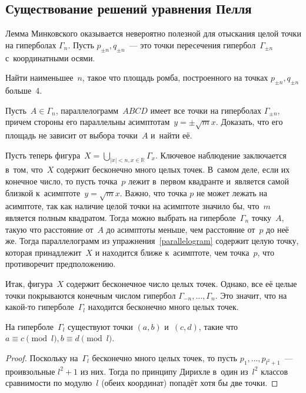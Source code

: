 \documentclass{article}
\begin{document}
\subsection{Существование решений уравнения Пелля}

Лемма Минковского оказывается невероятно полезной для отыскания целой точки
на гиперболах $\Gamma_n$. Пусть $p_{\pm n}, q_{\pm n}$~--- это точки пересечения
гипербол~$\Gamma_{\pm n}$ с~координатными осями.

\begin{exercise}
  Найти наименьшее~$n$, такое что площадь ромба, построенного на точках
  $p_{\pm n}, q_{\pm n}$ больше~4.
\end{exercise}

\begin{exercise}
  \label{parallelogram}
  Пусть~$A \in \Gamma_n$, параллелограмм~$ABCD$ имеет все точки на гиперболах
  $\Gamma_{\pm n}$, причем стороны его параллельны асимптотам~$y = \pm \sqrt{m}
  x$. Доказать, что его площадь не зависит от выбора точки~$A$ и~найти её.
\end{exercise}

Пусть теперь фигура~$X = \bigcup\limits_{|x| < n, x \in \mathbb{R}} \Gamma_x$.
Ключевое наблюдение заключается в~том, что~$X$ содержит бесконечно много целых
точек. В~самом деле, если их конечное число, то пусть точка~$p$ лежит в~первом
квадранте и~является самой близкой к~асимптоте~$y = \sqrt{m}x$. Важно, что точка
$p$ не может лежать на асимптоте, так как наличие целой точки на асимптоте
значило бы, что~$m$ является полным квадратом. Тогда можно выбрать на
гиперболе~$\Gamma_n$ точку~$A$, такую что расстояние от~$A$ до асимптоты меньше,
чем расстояние от~$p$ до неё же. Тогда параллелограмм из
упражнения~\ref{parallelogram} содержит целую точку, которая принадлежит~$X$ и
находится ближе к~асимптоте, чем точка~$p$, что противоречит предположению.

Итак, фигура~$X$ содержит бесконечное число целых точек. Однако, все её целые
точки покрываются конечным числом гипербол $\Gamma_{-n}, \ldots, \Gamma_n$.
Это значит, что на какой-то гиперболе~$\Gamma_l$ находится бесконечно много
целых точек.

\begin{claim}
  На гиперболе~$\Gamma_l$ существуют точки $(a, b)$ и~$(c, d)$, такие что~$a
  \equiv c\pmod l, b \equiv d\pmod l$.
\end{claim}
\begin{proof}
  Поскольку на~$\Gamma_l$ бесконечно много целых точек, то пусть $p_1, \ldots,
  p_{l^2 + 1}$~--- проивзольные $l^2 + 1$ из них. Тогда по принципу Дирихле
  в~один из~$l^2$ классов сравнимости по модулю~$l$ (обеих координат) попадёт
  хотя бы две точки.
\end{proof}
\end{document}
